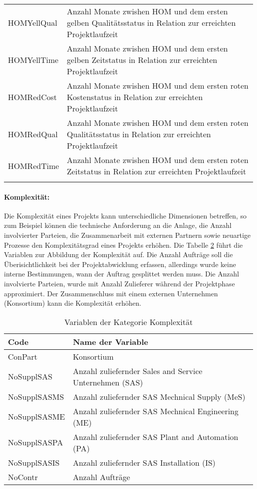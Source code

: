 \begin{longtable}[ht]{p{}p{}}
		HOMYellQual & Anzahl Monate zwishen HOM und dem ersten gelben Qualitätsstatus in Relation zur erreichten Projektlaufzeit \\
		HOMYellTime & Anzahl Monate zwishen HOM und dem ersten gelben Zeitstatus in Relation zur erreichten Projektlaufzeit \\
		HOMRedCost & Anzahl Monate zwishen HOM und dem ersten roten Kostenstatus in Relation zur erreichten Projektlaufzeit \\
		HOMRedQual & Anzahl Monate zwishen HOM und dem ersten roten Qualitätsstatus in Relation zur erreichten Projektlaufzeit \\
		HOMRedTime & Anzahl Monate zwishen HOM und dem ersten roten Zeitstatus in Relation zur erreichten Projektlaufzeit \\
		\bottomrule
	\label{tab:ffvar}%
\end{longtable}%
\paragraph{Komplexität:} Die Komplexität eines Projekts kann unterschiedliche Dimensionen betreffen, so zum Beispiel können die technische Anforderung an die Anlage, die Anzahl involvierter Parteien, die Zusammenarbeit mit externen Partnern sowie neuartige Prozesse den Komplexitätsgrad eines Projekts erhöhen. Die Tabelle \ref{tab:covar} führt die Variablen zur Abbildung der Komplexität auf. Die Anzahl Aufträge soll die Überisichtlichkeit bei der Projektabwicklung erfassen, allerdings wurde keine interne Bestimmungen, wann der Auftrag gesplittet werden muss. Die Anzahl involvierte Parteien, wurde mit Anzahl Zulieferer während der Projektphase approximiert. Der Zusammenschluss mit einem externen Unternehmen (Konsortium) kann die Komplexität erhöhen.
\begin{table}[htbp]
	\centering
	\caption{Variablen der Kategorie Komplexität}
	\begin{tabular}{ll}
			\toprule
		\textbf{Code} & \textbf{Name der Variable} \\ \midrule
		ConPart & Konsortium \\
		NoSupplSAS & Anzahl zuliefernder Sales and Service Unternehmen (SAS) \\
		NoSupplSASMS & Anzahl zuliefernder SAS Mechnical Supply (MeS) \\
		NoSupplSASME & Anzahl zuliefernder SAS Mechnical Engineering (ME) \\
		NoSupplSASPA & Anzahl zuliefernder SAS Plant and Automation (PA) \\
		NoSupplSASIS & Anzahl zuliefernder SAS Installation (IS) \\
		NoContr & Anzahl Aufträge \\ 
		\bottomrule
	\end{tabular}%
	\label{tab:covar}%
\end{table}%
